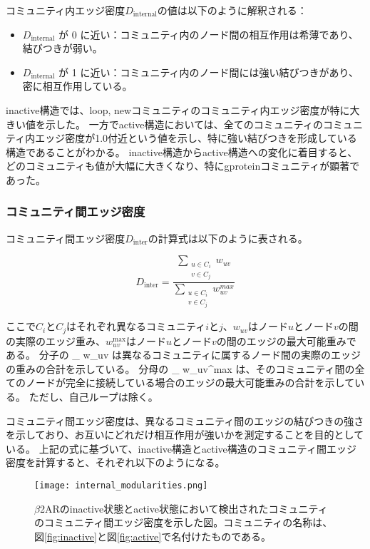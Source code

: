 コミュニティ内エッジ密度$D_{\text{internal}}$の値は以下のように解釈される：
\begin{itemize}
    \item \( D_{\text{internal}} \) が 0 に近い：コミュニティ内のノード間の相互作用は希薄であり、結びつきが弱い。
    \item \( D_{\text{internal}} \) が 1 に近い：コミュニティ内のノード間には強い結びつきがあり、密に相互作用している。
\end{itemize}

inactive構造では、loop, newコミュニティのコミュニティ内エッジ密度が特に大きい値を示した。
一方でactive構造においては、全てのコミュニティのコミュニティ内エッジ密度が1.0付近という値を示し、特に強い結びつきを形成している構造であることがわかる。
inactive構造からactive構造への変化に着目すると、どのコミュニティも値が大幅に大きくなり、特にgproteinコミュニティが顕著であった。

\subsubsection{コミュニティ間エッジ密度}
コミュニティ間エッジ密度$D_{\text{inter}}$の計算式は以下のように表される。

\[
D_{\text{inter}} = \frac{\sum_{\substack{u \in C_i \\ v \in C_j}} w_{uv}}{\sum_{\substack{u \in C_i \\ v \in C_j}} w_{uv}^{max}}
\label{eq:inter_density}
\]

ここで$C_i$と$C_j$はそれぞれ異なるコミュニティ$i$と$j$、$w_{uv}$はノード$u$とノード$v$の間の実際のエッジ重み、$w_{uv}^{\text{max}}$はノード$u$とノード$v$の間のエッジの最大可能重みである。
分子の \sum_{} w_{uv} は異なるコミュニティに属するノード間の実際のエッジの重みの合計を示している。
分母の \sum_{} w_{uv}^{max} は、そのコミュニティ間の全てのノードが完全に接続している場合のエッジの最大可能重みの合計を示している。
ただし、自己ループは除く。

コミュニティ間エッジ密度は、異なるコミュニティ間のエッジの結びつきの強さを示しており、お互いにどれだけ相互作用が強いかを測定することを目的としている。
上記の式に基づいて、inactive構造とactive構造のコミュニティ間エッジ密度を計算すると、それぞれ以下のようになる。

\begin{figure}[htbp]
    \centering
    \texttt{[image: internal\_modularities.png]}
    \caption{$\beta$2ARのinactive状態とactive状態において検出されたコミュニティのコミュニティ間エッジ密度を示した図。コミュニティの名称は、図\ref{fig:inactive}と図\ref{fig:active}で名付けたものである。}
    \label{fig:internal}
\end{figure}

